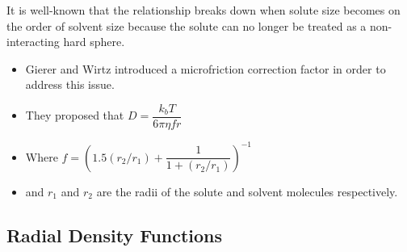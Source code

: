 \documentclass{article}
\begin{document}
  \noindent It is well-known that the relationship breaks down when solute size becomes
  on the order of solvent size because the solute can no longer be treated
  as a non-interacting hard sphere. %
  \begin{itemize}
    \item Gierer and Wirtz introduced a microfriction correction factor in order to 
    address this issue. 
    \item They proposed that $D = \dfrac{k_bT}{6\pi\eta fr}$
    \item Where $f = \left(1.5(r_2/r_1) + \dfrac{1}{1 + (r_2/r_1)}\right)^{-1}$
    \item and $r_1$ and $r_2$ are the radii of the solute and solvent molecules
    respectively.
  \end{itemize}

  \subsection*{Radial Density Functions}\label{method:rdfs}
\end{document}
